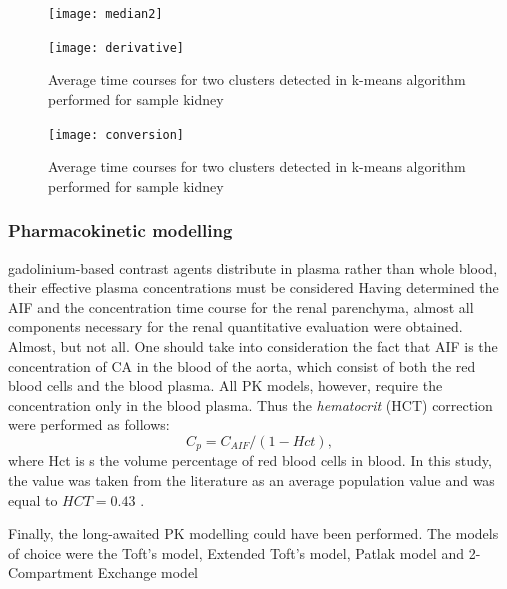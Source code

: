 \begin{figure}[H]
	\centering
	\texttt{[image: median2]}
\caption[]{}
\label{fig:median}
\end{figure}

\begin{figure}[H]
	\centering
	\texttt{[image: derivative]}
\caption[Average time courses for two clusters detected in k-means algorithm]{Average time courses for two clusters detected in k-means algorithm performed for sample kidney}
\label{fig:derivative}
\end{figure}

\begin{figure}[H]
	\centering
	\texttt{[image: conversion]}
\caption[Average time courses for two clusters detected in k-means algorithm]{Average time courses for two clusters detected in k-means algorithm performed for sample kidney}
\label{fig:conversion}
\end{figure}


\subsubsection{Pharmacokinetic modelling}

gadolinium-based contrast agents distribute in plasma rather than whole blood, their effective plasma concentrations must be considered
Having determined the AIF and the concentration time course for the renal parenchyma, almost all components necessary for the renal  quantitative evaluation were obtained. Almost, but not all. One should take into consideration the fact that AIF is the concentration of CA in the blood of the aorta, which consist of both the red blood cells and the blood plasma. All PK models, however, require the concentration only in the blood plasma. Thus the \textit{hematocrit} (HCT) correction were performed as follows:
\begin{equation}
	\label{eq:hematocrit}
	C_{p} = C_{AIF} / (1-Hct),
\end{equation}
where Hct is s the volume percentage of red blood cells in blood. In this study, the value was taken from the literature as an average population value and was equal to $HCT=0.43$ \cite{hematocrit}.

Finally, the long-awaited PK modelling could have been performed. The models of choice were the Toft's model, Extended Toft's model, Patlak model and 2-Compartment Exchange model 
 
